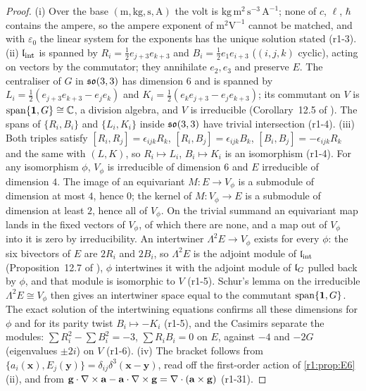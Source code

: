 \begin{proof}
(i) Over the base $(\mathrm m,\mathrm{kg},\mathrm s,\mathrm A)$ the volt is $\mathrm{kg\,m^2\,s^{-3}\,A^{-1}}$; none of $c$, $\ell$,
$\hbar$ contains the ampere, so the ampere exponent of $\mathrm{m^2V^{-1}}$ cannot be matched, and with $\varepsilon_0$ the linear system
for the exponents has the unique solution stated (r1-3). (ii) $\mathfrak l_{\rm int}$ is spanned by $R_i=\tfrac12e_{j+3}e_{k+3}$ and
$B_i=\tfrac12e_1e_{i+3}$ ($(i,j,k)$ cyclic), acting on vectors by the commutator; they annihilate $e_2,e_3$ and preserve $E$. The
centraliser of $G$ in $\mathfrak{so}(3,3)$ has dimension $6$ and is spanned by $L_i=\tfrac12(e_{j+3}e_{k+3}-e_je_k)$ and
$K_i=\tfrac12(e_ke_{j+3}-e_je_{k+3})$; its commutant on $V$ is $\operatorname{span}\{\mathbf 1,G\}\cong\mathbb{C}$, a division algebra, and $V$ is
irreducible (Corollary~12.5 of \cite{ES17}). The spans of $\{R_i,B_i\}$ and $\{L_i,K_i\}$ inside $\mathfrak{so}(3,3)$ have trivial intersection (r1-4).
(iii) Both triples satisfy $[R_i,R_j]=\epsilon_{ijk}R_k$, $[R_i,B_j]=\epsilon_{ijk}B_k$, $[B_i,B_j]=-\epsilon_{ijk}R_k$ and the same with
$(L,K)$, so $R_i\mapsto L_i$, $B_i\mapsto K_i$ is an isomorphism (r1-4). For any isomorphism $\phi$, $V_\phi$ is irreducible of dimension
$6$ and $E$ irreducible of dimension $4$. The image of an equivariant $M:E\to V_\phi$ is a submodule of dimension at most $4$, hence $0$;
the kernel of $M:V_\phi\to E$ is a submodule of dimension at least $2$, hence all of $V_\phi$. On the trivial summand an equivariant map
lands in the fixed vectors of $V_\phi$, of which there are none, and a map out of $V_\phi$ into it is zero by irreducibility. An intertwiner
$\Lambda^2E\to V_\phi$ exists for every $\phi$: the six bivectors of $E$ are $2R_i$ and $2B_i$, so $\Lambda^2E$ is the adjoint module of $\mathfrak l_{\rm int}$
(Proposition~12.7 of \cite{ES17}), $\phi$ intertwines it with the adjoint module of $\mathfrak l_G$ pulled back by $\phi$, and that module is
isomorphic to $V$ (r1-5). Schur's lemma \cite{GoodmanWallach} on the irreducible $\Lambda^2E\cong V_\phi$ then gives an intertwiner space
equal to the commutant $\operatorname{span}\{\mathbf 1,G\}$.
The exact solution of the intertwining equations confirms all these dimensions for $\phi$ and for its parity twist $B_i\mapsto-K_i$ (r1-5),
and the Casimirs separate the modules: $\sum R_i^2-\sum B_i^2=-3$, $\sum R_iB_i=0$ on $E$, against $-4$ and $-2G$ (eigenvalues $\pm2i$) on
$V$ (r1-6). (iv) The bracket follows from $\{a_i(\mathbf x),E_j(\mathbf y)\}=\delta_{ij}\delta^3(\mathbf x-\mathbf y)$, read off the
first-order action of \cref{r1:prop:E6}(ii), and from $\mathbf g\cdot\nabla\times\mathbf a-\mathbf a\cdot\nabla\times\mathbf g=\nabla\cdot(\mathbf
a\times\mathbf g)$ (r1-31).
\end{proof}

